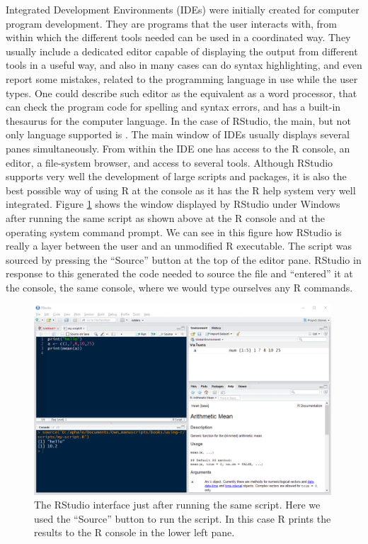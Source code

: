 \documentclass[krantz2,ChapterTOCs]{krantz}\usepackage{knitr}
\begin{document}
Integrated Development Environments (IDEs) were initially created for computer program development. They are programs that the user interacts with, from within which the different tools needed can be used in a coordinated way. They usually include a dedicated editor capable of displaying the output from different tools in a useful way, and also in many cases can do syntax highlighting, and even report some mistakes, related to the programming language in use while the user types. One could describe such editor as the equivalent as a word processor, that can check the program code for spelling and syntax errors, and has a built-in thesaurus for the computer language. In the case of RStudio, the main, but not only language supported is \Rlang. The main window of IDEs usually displays several panes simultaneously. From within the IDE one has access to the R console, an editor, a file-system browser, and access to several tools. Although RStudio supports very well the development of large scripts and packages, it is also the best possible way of using R at the console as it has the R help system very well integrated. Figure \ref{fig:intro:rstudio} shows the window displayed by RStudio under Windows after running the same script as shown above at the R console and at the operating system command prompt. We can see in this figure how RStudio is really a layer between the user and an unmodified R executable. The script was sourced by pressing the ``Source'' button at the top of the editor pane. RStudio in response to this generated the code needed to source the file and ``entered'' it at the console, the same console, where we would type ourselves any R commands.

\begin{figure}
  \centering
  \includegraphics[width=0.99\textwidth]{figures/Rstudio-script}
  \caption[Script in Rstudio]{The RStudio interface just after running the same script. Here we used the ``Source'' button to run the script. In this case R prints the results to the R console in the lower left pane.}\label{fig:intro:rstudio}
\end{figure}
\end{document}
